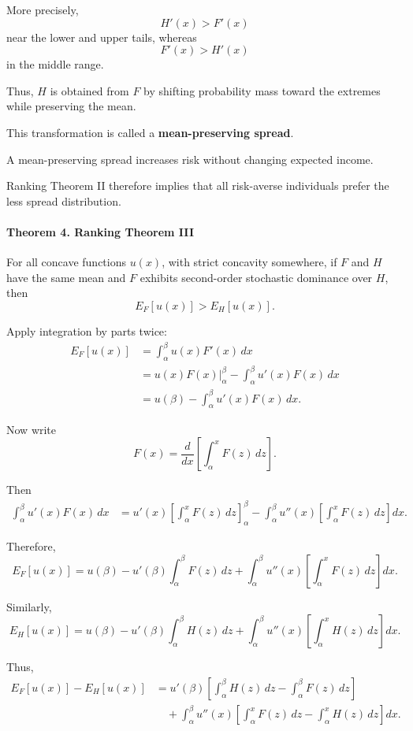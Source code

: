 More precisely,
\[
H'(x)>F'(x)
\]
near the lower and upper tails, whereas
\[
F'(x)>H'(x)
\]
in the middle range.

Thus, \(H\) is obtained from \(F\) by shifting probability mass toward the extremes while preserving the mean.

This transformation is called a \textbf{mean-preserving spread}.

A mean-preserving spread increases risk without changing expected income.

Ranking Theorem II therefore implies that all risk-averse individuals prefer the less spread distribution.



\paragraph{Theorem 4. Ranking Theorem III}

For all concave functions \(u(x)\), with strict concavity somewhere, if \(F\) and \(H\) have the same mean and \(F\) exhibits second-order stochastic dominance over \(H\), then
\[
E_F[u(x)]>E_H[u(x)].
\]

Apply integration by parts twice:
\[
\begin{aligned}
E_F[u(x)]
&=
\int_{\alpha}^{\beta}u(x)F'(x)\,dx \\
&=
u(x)F(x)\bigg|_{\alpha}^{\beta}
-
\int_{\alpha}^{\beta}u'(x)F(x)\,dx \\
&=
u(\beta)
-
\int_{\alpha}^{\beta}u'(x)F(x)\,dx.
\end{aligned}
\]

Now write
\[
F(x)
=
\frac{d}{dx}
\left[
\int_{\alpha}^{x}F(z)\,dz
\right].
\]

Then
\[
\begin{aligned}
\int_{\alpha}^{\beta}u'(x)F(x)\,dx
&=
u'(x)
\left[
\int_{\alpha}^{x}F(z)\,dz
\right]_{\alpha}^{\beta}
-
\int_{\alpha}^{\beta}
u''(x)
\left[
\int_{\alpha}^{x}F(z)\,dz
\right]dx.
\end{aligned}
\]

Therefore,
\[
E_F[u(x)]
=
u(\beta)
-
u'(\beta)
\int_{\alpha}^{\beta}F(z)\,dz
+
\int_{\alpha}^{\beta}
u''(x)
\left[
\int_{\alpha}^{x}F(z)\,dz
\right]dx.
\]

Similarly,
\[
E_H[u(x)]
=
u(\beta)
-
u'(\beta)
\int_{\alpha}^{\beta}H(z)\,dz
+
\int_{\alpha}^{\beta}
u''(x)
\left[
\int_{\alpha}^{x}H(z)\,dz
\right]dx.
\]

Thus,
\[
\begin{aligned}
E_F[u(x)]-E_H[u(x)]
&=
u'(\beta)
\left[
\int_{\alpha}^{\beta}H(z)\,dz
-
\int_{\alpha}^{\beta}F(z)\,dz
\right] \\
&\quad+
\int_{\alpha}^{\beta}
u''(x)
\left[
\int_{\alpha}^{x}F(z)\,dz
-
\int_{\alpha}^{x}H(z)\,dz
\right]dx.
\end{aligned}
\]

